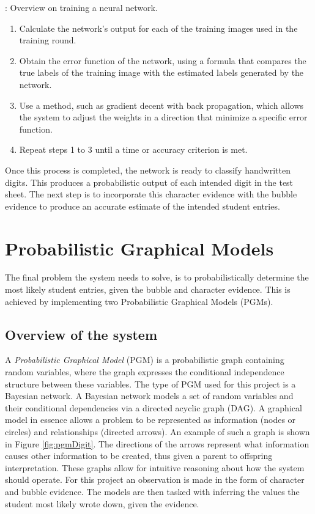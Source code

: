 \begin{algorithm}[H]
\caption{: Overview on training a neural network.}
\label{alg:nnTrain}
\begin{enumerate}
\item Calculate the network's output for each of the training images used in the training round.
\item Obtain the error function of the network, using a formula that compares the true labels of the training image with the estimated labels generated by the network.
\item Use a method, such as gradient decent with back propagation, which allows the system to adjust the weights in a direction that minimize a specific error function.
\item Repeat steps 1 to 3 until a time or accuracy criterion is met.
\end{enumerate}
\end{algorithm}

Once this process is completed, the network is ready to classify handwritten digits. This produces a probabilistic output of each intended digit in the test sheet. The next step is to incorporate this character evidence with the bubble evidence to produce an accurate estimate of the intended student entries.
\section{Probabilistic Graphical Models}
\label{sec:PGM}
The final problem the system needs to solve, is to probabilistically determine the most likely student entries, given the bubble and character evidence. This is achieved by implementing two Probabilistic Graphical Models (PGMs).

\subsection{Overview of the system}
A \textsl{Probabilistic Graphical Model} (PGM) is a probabilistic graph containing random variables, where the graph expresses the conditional independence structure between these variables. The type of PGM used for this project is a Bayesian network. A Bayesian network models a set of random variables and their conditional dependencies via a directed acyclic graph (DAG). %
A graphical model in essence allows a problem to be represented as information (nodes or circles) and relationships (directed arrows). An example of such a graph is shown in Figure \ref{fig:pgmDigit}. The directions of the arrows represent what information causes other information to be created, thus given a parent to offspring interpretation. These graphs allow for intuitive reasoning about how the system should operate. For this project an observation is made in the form of character and bubble evidence. The models are then tasked with inferring the values the student most likely wrote down, given the evidence.

